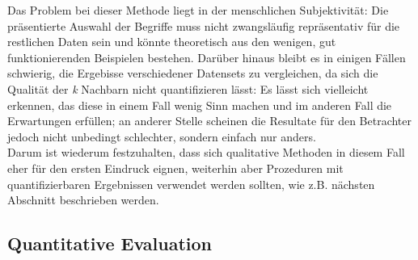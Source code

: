  Das Problem bei dieser Methode liegt in der menschlichen Subjektivität: Die präsentierte Auswahl der Begriffe
  muss nicht zwangsläufig repräsentativ für die restlichen Daten sein und könnte theoretisch aus den wenigen,
  gut funktionierenden Beispielen bestehen. Darüber hinaus bleibt es in einigen Fällen schwierig,
  die Ergebisse verschiedener Datensets zu vergleichen, da sich die Qualität der \emph{k} Nachbarn
  nicht quantifizieren lässt: Es lässt sich vielleicht erkennen, das diese in einem Fall wenig Sinn machen und
  im anderen Fall die Erwartungen erfüllen; an anderer Stelle scheinen die Resultate für den Betrachter jedoch nicht
  unbedingt schlechter, sondern einfach nur anders.\\
  Darum ist wiederum festzuhalten, dass sich qualitative Methoden in diesem Fall eher für den ersten Eindruck
  eignen, weiterhin aber Prozeduren mit quantifizierbaren Ergebnissen verwendet werden sollten, wie z.B.
  nächsten Abschnitt beschrieben werden.

  \subsection{Quantitative Evaluation}


